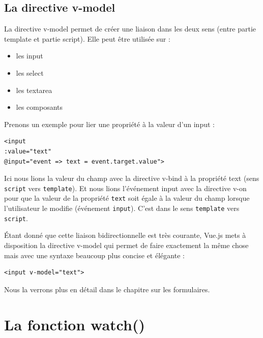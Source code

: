 \documentclass{article}
\begin{document}
\subsection{La directive v-model}
La directive {\color{monOrange}v-model} permet de créer une liaison dans les deux sens (entre partie {\color{blue} template} et partie {\color{blue} script}). Elle peut être utilisée sur :
\begin{itemize}
\item les {\color{monOrange} input}
\item les {\color{monOrange} select}
\item les {\color{monOrange} textarea}
\item les composants
\end{itemize}

Prenons un exemple pour lier une propriété à la valeur d'un input :
\begin{verbatim}
<input
:value="text"
@input="event => text = event.target.value">
\end{verbatim}
Ici nous lions la valeur du champ avec la directive {\color{monOrange}v-bind} à la propriété {\color{monOrange}text } (sens {\tt script} vers {\tt template}). Et nous lions l'événement {\color{monOrange}input} avec la directive {\color{monOrange}v-on} pour que la valeur de la propriété {\tt text} soit égale à la valeur du champ lorsque l'utilisateur le modifie (événement {\tt input}). C'est dans le sens {\tt template} vers {\tt script}.

Étant donné que cette liaison bidirectionnelle est très courante, {\color{monOrange}Vue.js} mets à disposition la directive {\color{monOrange}v-model} qui permet de faire exactement la même chose mais avec une syntaxe beaucoup plus concise et élégante :
\begin{verbatim}
<input v-model="text">
\end{verbatim}

Nous la verrons plus en détail dans le chapitre sur les formulaires.



\section{La fonction watch()}
\end{document}
